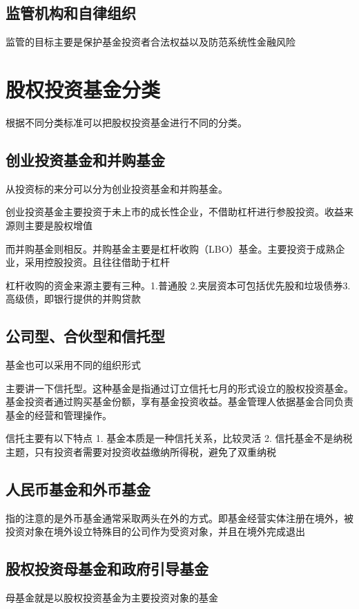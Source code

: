 \documentclass[UTF8,12pt]{ctexbook}
\numberwithin{equation}{section} %
\numberwithin{figure}{section}
\numberwithin{table}{section}
\begin{document}
	\subsection{监管机构和自律组织}
	
	监管的目标主要是保护基金投资者合法权益以及防范系统性金融风险
	
	\section{股权投资基金分类}
	根据不同分类标准可以把股权投资基金进行不同的分类。
	
	\subsection{创业投资基金和并购基金}
	从投资标的来分可以分为创业投资基金和并购基金。
	
	创业投资基金主要投资于未上市的成长性企业，不借助杠杆进行参股投资。收益来源则主要是股权增值
	
	而并购基金则相反。并购基金主要是杠杆收购（LBO）基金。主要投资于成熟企业，采用控股投资。且往往借助于杠杆
	
	杠杆收购的资金来源主要有三种。1.普通股 2.夹层资本可包括优先股和垃圾债券3. 高级债，即银行提供的并购贷款
	
	\subsection{公司型、合伙型和信托型}
	基金也可以采用不同的组织形式
	
	主要讲一下信托型。这种基金是指通过订立信托七月的形式设立的股权投资基金。基金投资者通过购买基金份额，享有基金投资收益。基金管理人依据基金合同负责基金的经营和管理操作。
	
	信托主要有以下特点
	1. 基金本质是一种信托关系，比较灵活
	2. 信托基金不是纳税主题，只有投资者需要对投资收益缴纳所得税，避免了双重纳税
	
	\subsection{人民币基金和外币基金}
	
	指的注意的是外币基金通常采取两头在外的方式。即基金经营实体注册在境外，被投资对象在境外设立特殊目的公司作为受资对象，并且在境外完成退出
	
	\subsection{股权投资母基金和政府引导基金}
	母基金就是以股权投资基金为主要投资对象的基金
	
\end{document}
